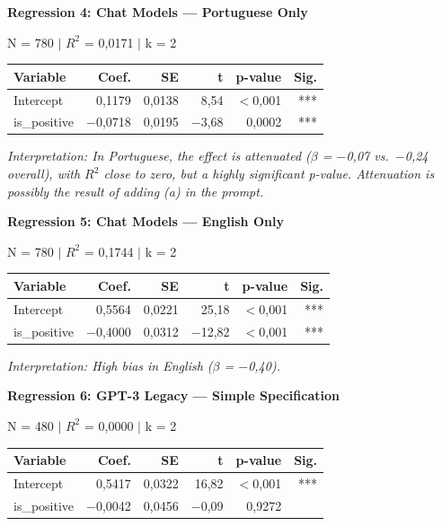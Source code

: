\documentclass[12pt,a4paper]{article}
\begin{document}
\vspace{0.5cm}
\noindent\textbf{Regression 4: Chat Models --- Portuguese Only}

\noindent N = 780 $|$ $R^2$ = 0,0171 $|$ k = 2

\begin{table}[H]
\centering
\begin{tabular}{lrrrrr}
\toprule
\textbf{Variable} & \textbf{Coef.} & \textbf{SE} & \textbf{t} & \textbf{p-value} & \textbf{Sig.} \\
\midrule
Intercept & 0,1179 & 0,0138 & 8,54 & $<$0,001 & *** \\
is\_positive & $-$0,0718 & 0,0195 & $-$3,68 & 0,0002 & *** \\
\bottomrule
\end{tabular}
\end{table}

\noindent\textit{Interpretation: In Portuguese, the effect is attenuated ($\beta$ = $-$0,07 vs.\ $-$0,24
overall), with $R^2$ close to zero, but a highly significant p-value.
Attenuation is possibly the result of adding (a) in the prompt.}

\vspace{0.5cm}
\noindent\textbf{Regression 5: Chat Models --- English Only}

\noindent N = 780 $|$ $R^2$ = 0,1744 $|$ k = 2

\begin{table}[H]
\centering
\begin{tabular}{lrrrrr}
\toprule
\textbf{Variable} & \textbf{Coef.} & \textbf{SE} & \textbf{t} & \textbf{p-value} & \textbf{Sig.} \\
\midrule
Intercept & 0,5564 & 0,0221 & 25,18 & $<$0,001 & *** \\
is\_positive & $-$0,4000 & 0,0312 & $-$12,82 & $<$0,001 & *** \\
\bottomrule
\end{tabular}
\end{table}

\noindent\textit{Interpretation: High bias in English ($\beta$ = $-$0,40).}

\vspace{0.5cm}
\noindent\textbf{Regression 6: GPT-3 Legacy --- Simple Specification}

\noindent N = 480 $|$ $R^2$ = 0,0000 $|$ k = 2

\begin{table}[H]
\centering
\begin{tabular}{lrrrrr}
\toprule
\textbf{Variable} & \textbf{Coef.} & \textbf{SE} & \textbf{t} & \textbf{p-value} & \textbf{Sig.} \\
\midrule
Intercept & 0,5417 & 0,0322 & 16,82 & $<$0,001 & *** \\
is\_positive & $-$0,0042 & 0,0456 & $-$0,09 & 0,9272 & \\
\bottomrule
\end{tabular}
\end{table}
\end{document}

